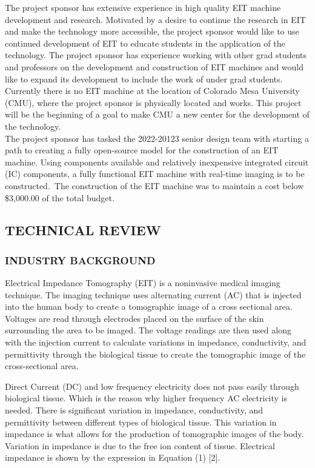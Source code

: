 \documentclass[12pt]{article}
\begin{document}
The project sponsor has extensive experience in high quality EIT machine
development and research. Motivated by a desire to continue the research
in EIT and make the technology more accessible, the project sponsor
would like to use continued development of EIT to educate students in
the application of the technology. The project sponsor has experience
working with other grad students and professors on the development and
construction of EIT machines and would like to expand its development to
include the work of under grad students. Currently there is no EIT
machine at the location of Colorado Mesa University (CMU), where the
project sponsor is physically located and works. This project will be
the beginning of a goal to make CMU a new center for the development of
the technology.\\
The project sponsor has tasked the 2022-20123 senior design team with
starting a path to creating a fully open-source model for the
construction of an EIT machine. Using components available and
relatively inexpensive integrated circuit (IC) components, a fully
functional EIT machine with real-time imaging is to be constructed.~The
construction of the EIT machine was to maintain a cost below \$3,000.00
of the total budget.

\subsection{TECHNICAL REVIEW}\label{technical-review}

\subsubsection{INDUSTRY BACKGROUND}\label{industry-background}
Electrical Impedance Tomography (EIT) is a noninvasive medical imaging
technique. The imaging technique uses alternating current (AC) that is
injected into the human body to create a tomographic image of a cross
sectional area. Voltages are read through electrodes placed on the
surface of the skin surrounding the area to be imaged. The voltage
readings are then used along with the injection current to calculate
variations in impedance, conductivity, and permittivity through the
biological tissue to create the tomographic image of the cross-sectional
area.

Direct Current (DC) and low frequency electricity does not pass easily
through biological tissue. Which is the reason why higher frequency AC
electricity is needed. There is significant variation in impedance,
conductivity, and permittivity between different types of biological
tissue. This variation in impedance is what allows for the production of
tomographic images of the body. Variation in impedance is due to the
free ion content of tissue. Electrical impedance is shown by the
expression in Equation (1) {[}2{]}.
\end{document}
